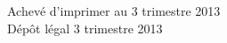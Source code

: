 \cleardoublepage
\mbox{}
\vfill

{\scriptsize
\begin{center}
Achevé d'imprimer au 3 trimestre 2013 \\
Dépôt légal\frcolon{} 3 trimestre 2013
\end{center}
}
\enlargethispage{\footskip}


